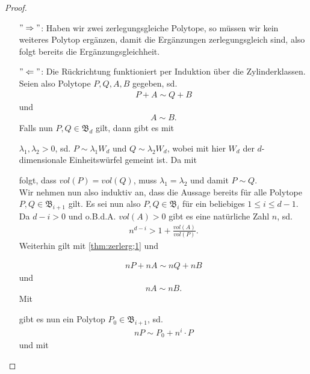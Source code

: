 \documentclass[11pt,titlepage]{article}
\theoremstyle{definition}
\theoremstyle{remark}
\begin{document}
	\begin{proof}
		\noindent
		\begin{itemize}
			\item[$"\Rightarrow"$:] Haben wir zwei zerlegungsgleiche Polytope, so müssen wir kein weiteres Polytop ergänzen, damit die Ergänzungen zerlegungsgleich sind, also folgt bereits die Ergänzungsgleichheit.
			
			\item[$"\Leftarrow"$:] Die Rückrichtung funktioniert per 
			Induktion über die Zylinderklassen. Seien also Polytope 
			$P,Q,A,B$ gegeben, sd. 
			\begin{align}
				P+A\sim Q+B \label{thm:zerlerg;1}
			\end{align}
			und
			\begin{align}
				A\sim B. \label{thm:zerlerg;2}
			\end{align}
			Falls nun $P,Q\in \mathfrak{B}_d$ gilt, dann gibt es mit 
			
			
			$\lambda_1,\lambda_2 >0$, sd. $P\sim \lambda_1 W_d$ und 
			$Q\sim \lambda_2 W_d$, wobei mit hier $W_d$ der $d$-dimensionale 
			Einheitswürfel gemeint ist. Da mit 
			
			
			folgt, dass $vol(P)=vol(Q)$, muss $\lambda_1 =\lambda_2$ und 
			damit $P\sim Q$. \\
			Wir nehmen nun also induktiv an, dass die Aussage bereits für alle 
			Polytope $P,Q\in\mathfrak{B}_{i+1}$ gilt. Es sei nun also 
			$P,Q\in\mathfrak{B}_i$ für ein beliebiges $1\leq i\leq d-1$. 
			Da $d-i>0$ und o.B.d.A. $vol(A)>0$ gibt es eine natürliche Zahl $n$, sd. 
			\begin{align}
				n^{d-i}>1+\frac{vol(A)}{vol(P)}. \label{thm:zerlerg;3}
			\end{align}
			Weiterhin gilt mit \ref{thm:zerlerg;1} und 
			
			
			\begin{align}
				nP+nA\sim nQ+nB \label{thm:zerlerg;4}
			\end{align}
			und
			\begin{align}
				nA\sim nB. \label{thm:zerlerg;5}
			\end{align}
			Mit 
			
			
			gibt es nun ein Polytop $P_0\in\mathfrak{B}_{i+1}$, sd.
			\begin{align}
				nP\sim P_0 +n^i\cdot P \label{thm:zerlerg;6}
			\end{align}
			und mit
			

\end{itemize}
\end{proof}
\end{document}
